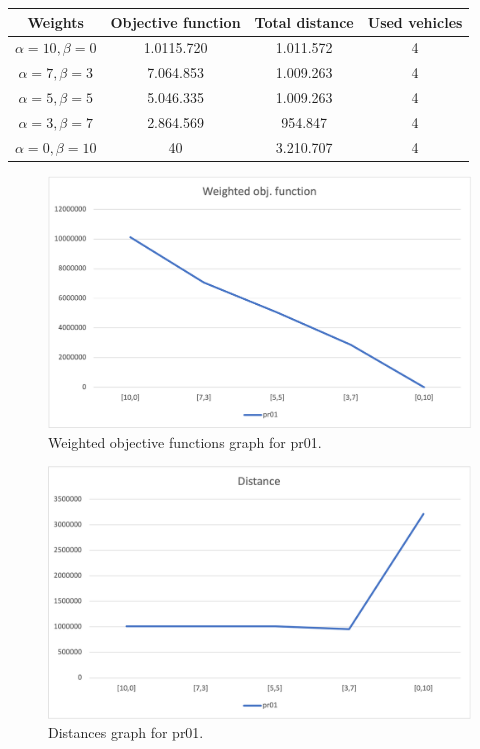 {
\renewcommand{\arraystretch}{2}
\begin{longtable}[h]{| c | c | c | c |}
    \hline
    \textbf{Weights} & \textbf{Objective function} & \textbf{Total distance} & \textbf{Used vehicles} \\
    \hline
    \endhead
    $\alpha = 10, \beta = 0$ & 1.0115.720 & 1.011.572 & 4 \\
    \hline
    $\alpha = 7, \beta = 3$  &  7.064.853 & 1.009.263 & 4 \\
    \hline
    $\alpha = 5, \beta = 5$  &  5.046.335 & 1.009.263 & 4 \\
    \hline
    $\alpha = 3, \beta = 7$  &  2.864.569 &   954.847 & 4 \\
    \hline
    $\alpha = 0, \beta = 10$ &         40 & 3.210.707 & 4 \\
    \hline
\end{longtable}
}
\begin{figure}[H]
    \centering
    \includegraphics[width=1.0\columnwidth]{../graphs/pr01-wobjf.png}
    \caption{Weighted objective functions graph for pr01.}
\end{figure}

\begin{figure}[H]
    \centering
    \includegraphics[width=1.0\columnwidth]{../graphs/pr01-distance.png}
    \caption{Distances graph for pr01.}
\end{figure}

